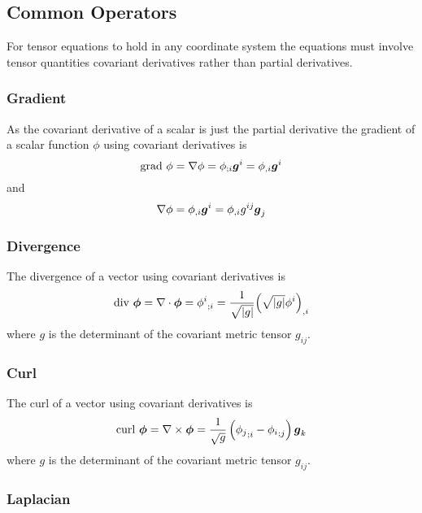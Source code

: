 \subsection{Common Operators}

For tensor equations to hold in any coordinate system the equations must
involve tensor quantities \ie covariant derivatives rather than partial derivatives.

\subsubsection{Gradient}

As the covariant derivative of a scalar is just the partial derivative the
gradient of a scalar function $\phi$ using covariant derivatives is
\begin{equation}
  \text{grad } \phi = \gradient{}{\phi}=\covarderiv{\phi}{i}\vectr{g}^{i}=\partialderiv{\phi}{i}\vectr{g}^{i}
\end{equation}
and
\begin{equation}
  \gradient{}{\phi}=\partialderiv{\phi}{i}\vectr{g}^{i}=\partialderiv{\phi}{i}g^{ij}\vectr{g}_{j}
\end{equation}

\subsubsection{Divergence}

The divergence of a vector using covariant derivatives is
\begin{equation}
  \text{div } \vectr{\phi} = \divergence{}{\vectr{\phi}}=\covarderiv{\phi^{i}}{i}=\frac{1}{\sqrt{\abs{g}}}\partialderiv{\pbrac{\sqrt{\abs{g}}\phi^{i}}}{i}
\end{equation}
where $g$ is the determinant of the covariant metric tensor $g_{ij}$.

\subsubsection{Curl}

The curl of a vector using covariant derivatives is
\begin{equation}
  \text{curl } \vectr{\phi} = \curl{}{\vectr{\phi}}=\frac{1}{\sqrt{g}}\pbrac{\covarderiv{\phi_{j}}{i}-\covarderiv{\phi_{i}}{j}}\vectr{g}_{k}
\end{equation}
where $g$ is the determinant of the covariant metric tensor $g_{ij}$.

\subsubsection{Laplacian}

